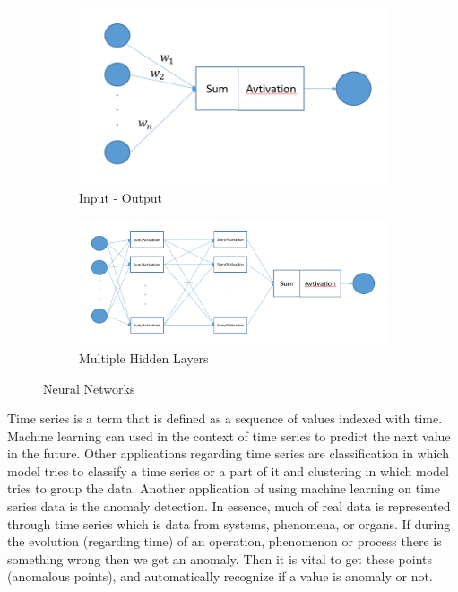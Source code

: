 \documentclass[a4paper,12pt]{report}
\theoremstyle{definitionNODot}
\begin{document}
	\begin{figure}[h]
		\begin{subfigure}[b]{0.33\textwidth}
			\centering
			\includegraphics[width=\textwidth]{single.png}
			\caption{Input - Output}
			\label{fig:single}
		\end{subfigure}
		\hfill
		\begin{subfigure}[b]{0.49\textwidth}
			\centering
			\includegraphics[width=\textwidth]{multiple.png}
			\caption{Multiple Hidden Layers}
			\label{fig:multiple}
		\end{subfigure}
		\caption{Neural Networks}
		\label{fig:neural_networks}
	\end{figure}
	
	Time series is a term that is defined as a sequence of values indexed with time. Machine learning can used in the context of time series to predict the next value in the future. Other applications regarding time series are classification in which model tries to classify a time series or a part of it and clustering in which model tries to group the data. Another application of using machine learning on time series data is the anomaly detection. In essence, much of real data is represented through time series which is data from systems, phenomena, or organs. If during the evolution (regarding time) of an operation, phenomenon or process there is something wrong then we get an anomaly. Then it is vital to get these points (anomalous points), and automatically recognize if a value is anomaly or not.
	
\end{document}
